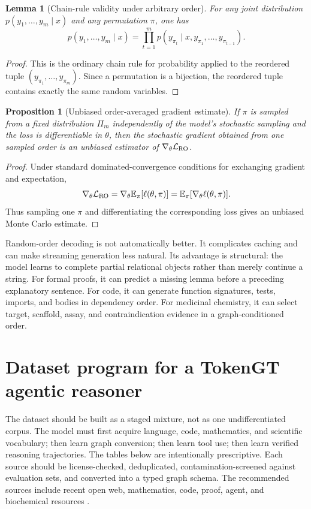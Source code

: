 \documentclass[11pt]{article}
\newtheorem{lemma}[definition]{Lemma}
\newtheorem{proposition}[definition]{Proposition}
\newcommand{\E}{\mathbb{E}}
\newcommand{\1}{\mathbf{1}}
\begin{document}
\begin{lemma}[Chain-rule validity under arbitrary order]
For any joint distribution $p(y_1,\ldots,y_m\mid x)$ and any permutation $\pi$, one has
\[
p(y_1,\ldots,y_m\mid x)=\prod_{t=1}^m p(y_{\pi_t}\mid x,y_{\pi_1},\ldots,y_{\pi_{t-1}}).
\]
\end{lemma}

\begin{proof}
This is the ordinary chain rule for probability applied to the reordered tuple $(y_{\pi_1},\ldots,y_{\pi_m})$. Since a permutation is a bijection, the reordered tuple contains exactly the same random variables. \qedhere
\end{proof}

\begin{proposition}[Unbiased order-averaged gradient estimate]
If $\pi$ is sampled from a fixed distribution $\Pi_m$ independently of the model's stochastic sampling and the loss is differentiable in $\theta$, then the stochastic gradient obtained from one sampled order is an unbiased estimator of $\nabla_\theta \mathcal{L}_{\rm RO}$.
\end{proposition}

\begin{proof}
Under standard dominated-convergence conditions for exchanging gradient and expectation,
\[
\nabla_\theta \mathcal{L}_{\rm RO}=\nabla_\theta \E_\pi[\ell(\theta,\pi)]=\E_\pi[\nabla_\theta \ell(\theta,\pi)].
\]
Thus sampling one $\pi$ and differentiating the corresponding loss gives an unbiased Monte Carlo estimate. \qedhere
\end{proof}

Random-order decoding is not automatically better. It complicates caching and can make streaming generation less natural. Its advantage is structural: the model learns to complete partial relational objects rather than merely continue a string. For formal proofs, it can predict a missing lemma before a preceding explanatory sentence. For code, it can generate function signatures, tests, imports, and bodies in dependency order. For medicinal chemistry, it can select target, scaffold, assay, and contraindication evidence in a graph-conditioned order.

\section{Dataset program for a TokenGT agentic reasoner}
\label{sec:dataset-program}

The dataset should be built as a staged mixture, not as one undifferentiated corpus. The model must first acquire language, code, mathematics, and scientific vocabulary; then learn graph conversion; then learn tool use; then learn verified reasoning trajectories. The tables below are intentionally prescriptive. Each source should be license-checked, deduplicated, contamination-screened against evaluation sets, and converted into a typed graph schema. The recommended sources include recent open web, mathematics, code, proof, agent, and biochemical resources \cite{FineWeb2024,Dolma2024,RedPajamaV2,OpenWebMath2023,ProofPile2,TheStackV2,OpenMathInstruct2,LeanDojo2023,LeanWorkbook2024,BigCodeBench2024,TauBench2024,OSWorld2024,ChEMBL2024,BindingDB2007}.
\end{document}
